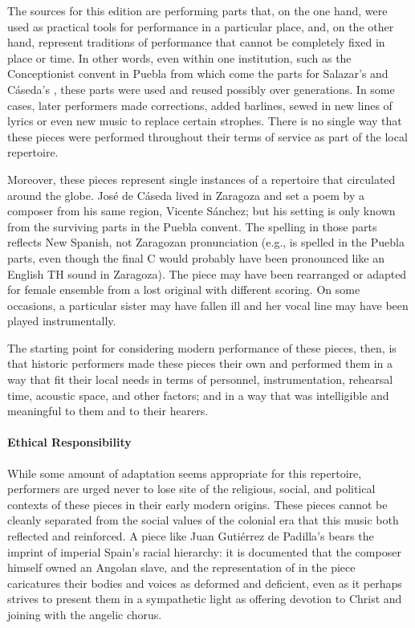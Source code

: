 The sources for this edition are performing parts that, on the one hand,
were used as practical tools for performance in a particular place, and, on the
other hand, represent traditions of performance that cannot be completely fixed
in place or time.
In other words, even within one institution, such as the Conceptionist convent
in Puebla from which come the parts for Salazar's 
and Cáseda's , these parts were used and reused
possibly over generations. 
In some cases, later performers made corrections, added barlines, sewed in new
lines of lyrics or even new music to replace certain strophes.
There is no single way that these pieces were performed throughout their terms
of service as part of the local repertoire.

Moreover, these pieces represent single instances of a repertoire that
circulated around the globe. 
José de Cáseda lived in Zaragoza and set a poem by a composer from his same
region, Vicente Sánchez; but his setting is only known from the surviving parts
in the Puebla convent.
The spelling in those parts reflects New Spanish, not Zaragozan pronunciation
(e.g.,  is spelled  in the
Puebla parts, even though the final C would probably have been pronounced like an
English TH sound in Zaragoza).
The piece may have been rearranged or adapted for female ensemble from a lost
original with different scoring.
On some occasions, a particular sister may have fallen ill and her vocal line
may have been played instrumentally.

The starting point for considering modern performance of these pieces, then, is
that historic performers made these pieces their own and performed them in a way
that fit their local needs in terms of personnel, instrumentation, rehearsal
time, acoustic space, and other factors; and in a way that was intelligible and
meaningful to them and to their hearers.

\paragraph{Ethical Responsibility}
While some amount of adaptation seems appropriate for this repertoire,
performers are urged never to lose site of the religious, social, and political
contexts of these pieces in their early modern origins.
These pieces cannot be cleanly separated from the social values of the colonial
era that this music both reflected and reinforced.
A piece like Juan Gutiérrez de Padilla's 
bears the imprint of imperial Spain's racial hierarchy: it is documented that
the composer himself owned an Angolan slave, and the representation of
 in the piece caricatures their bodies and voices as deformed
and deficient, even as it perhaps strives to present them in a sympathetic light
as offering devotion to Christ and joining with the angelic chorus.

